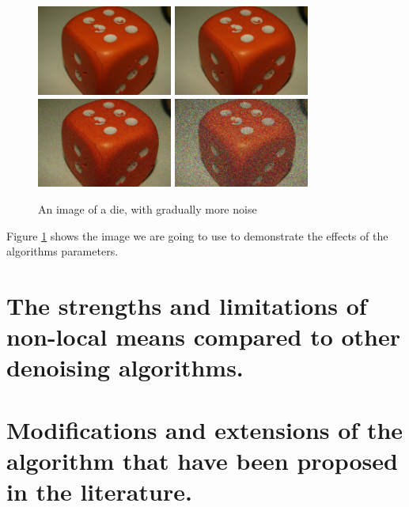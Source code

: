 \documentclass[11pt]{article}
\begin{document}
\begin{figure}
    \includegraphics[width=1.75in]{Images/dice.png}
    \includegraphics[width=1.75in]{Images/dice-Noise.png}
    \includegraphics[width=1.75in]{Images/dice-highNoise.png}
    \includegraphics[width=1.75in]{Images/dice-extremeNoise.png}
    \caption{An image of a die, with gradually more noise}
    \label{fig:diceNoiseProgression}
\end{figure}

Figure \ref{fig:diceNoiseProgression} shows the image we are going to use to demonstrate the effects of the algorithms parameters.




\section{The strengths and limitations of non-local means compared to other denoising algorithms. }



\section{Modifications and extensions of the algorithm that have been proposed in the literature. }
\end{document}
